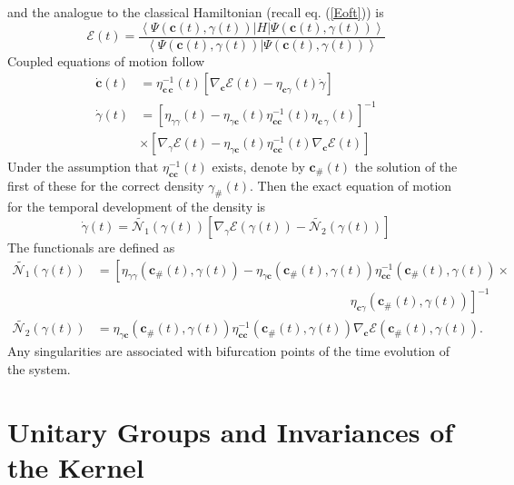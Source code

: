 \documentclass[aps,preprint]{revtex4}%
\begin{document}
and the analogue to the classical Hamiltonian (recall eq. (\ref{Eoft})) is
\begin{equation}
\mathcal{E}(t)=\frac{\left\langle \Psi(\mathbf{c}(t),\gamma(t))|H|\Psi
(\mathbf{c}(t),\gamma(t))\right\rangle }{\left\langle \Psi(\mathbf{c}%
(t),\gamma(t))|\Psi(\mathbf{c}(t),\gamma(t))\right\rangle } \label{Eofcgammat}%
\end{equation}
Coupled equations of motion follow
\begin{align}
\dot{\mathbf{c}}(t)  &  =\eta_{\mathbf{c\,c}}^{-1}(t)\left[  \nabla
_{\mathbf{c}}\mathcal{E}(t)-\eta_{\mathbf{c}\gamma}(t)\dot{\gamma}\right]
\nonumber\\
\dot{\gamma}(t)  &  =\left[  \eta_{\gamma\gamma}(t)-\eta_{\gamma\mathbf{c}%
}(t)\eta_{\mathbf{cc}}^{-1}(t)\eta_{\mathbf{c}\,\gamma}(t)\right]
^{-1}\nonumber\\
&  \times\left[  \nabla_{\gamma}\mathcal{E}(t)-\eta_{\gamma\mathbf{c}}%
(t)\eta_{\mathbf{cc}}^{-1}(t)\nabla_{\mathbf{c}}\mathcal{E}(t)\right]
\label{cdotgammadot}%
\end{align}
Under the assumption that $\eta_{\mathbf{cc}}^{-1}(t)$ exists, denote by
$\mathbf{c}_{\#}(t)$ the solution of the first of these for the correct
density $\gamma_{\#}(t)$. Then the exact equation of motion for the temporal
development of the density is
\begin{equation}
\dot{\gamma}(t)=\tilde{\mathcal{N}_{1}}(\gamma(t))\left[  \nabla_{\gamma
}\mathcal{E}(\gamma(t))-\tilde{\mathcal{N}_{2}}(\gamma(t))\right]
\label{Appgammadot}%
\end{equation}
The functionals are defined as
\begin{align}
\tilde{\mathcal{N}_{1}}(\gamma(t))  &  =\left[  \eta_{\gamma\gamma}%
(\mathbf{c}_{\#}(t),\gamma(t))-\eta_{\gamma\mathbf{c}}(\mathbf{c}%
_{\#}(t),\gamma(t))\eta_{\mathbf{cc}}^{-1}(\mathbf{c}_{\#}(t),\gamma
(t))\right.  \times\nonumber\\
&  \qquad\qquad\qquad\qquad\qquad\qquad\qquad\qquad\qquad\qquad\left.
\eta_{\mathbf{c}\gamma}(\mathbf{c}_{\#}(t),\gamma(t))\right]  ^{-1}\nonumber\\
\tilde{\mathcal{N}_{2}}(\gamma(t))  &  =\eta_{\gamma\mathbf{c}}(\mathbf{c}%
_{\#}(t),\gamma(t))\eta_{\mathbf{cc}}^{-1}(\mathbf{c}_{\#}(t),\gamma
(t))\nabla_{\mathbf{c}}\mathcal{E}(\mathbf{c}_{\#}(t),\gamma(t)).\quad
\end{align}
Any singularities are associated with bifurcation points of the time evolution
of the system.

\section{Unitary Groups and Invariances of the Kernel}
\end{document}
